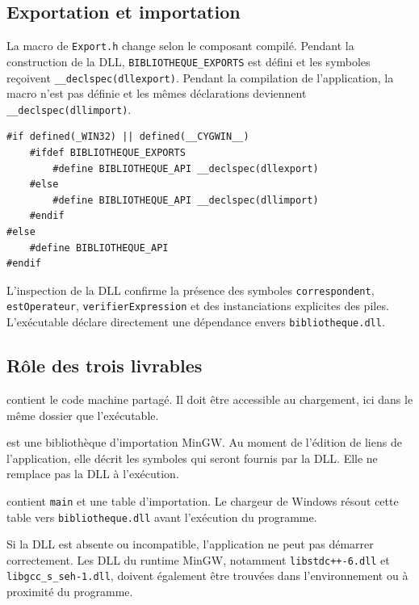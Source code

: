 \documentclass[11pt,a4paper]{article}
\newcommand{\fichier}[1]{\texttt{#1}}
\begin{document}
\subsection{Exportation et importation}

La macro de \fichier{Export.h} change selon le composant compilé. Pendant la construction de la DLL, \texttt{BIBLIOTHEQUE\_EXPORTS} est défini et les symboles reçoivent \texttt{\_\_declspec(dllexport)}. Pendant la compilation de l'application, la macro n'est pas définie et les mêmes déclarations deviennent \texttt{\_\_declspec(dllimport)}.

\begin{lstlisting}[style=cppstyle,caption={Macro de visibilité sous Windows}]
#if defined(_WIN32) || defined(__CYGWIN__)
    #ifdef BIBLIOTHEQUE_EXPORTS
        #define BIBLIOTHEQUE_API __declspec(dllexport)
    #else
        #define BIBLIOTHEQUE_API __declspec(dllimport)
    #endif
#else
    #define BIBLIOTHEQUE_API
#endif
\end{lstlisting}

L'inspection de la DLL confirme la présence des symboles \texttt{correspondent}, \texttt{estOperateur}, \texttt{verifierExpression} et des instanciations explicites des piles. L'exécutable déclare directement une dépendance envers \fichier{bibliotheque.dll}.

\subsection{Rôle des trois livrables}

\begin{description}[style=nextline,leftmargin=0pt]
  \item[\fichier{bibliotheque.dll}] contient le code machine partagé. Il doit être accessible au chargement, ici dans le même dossier que l'exécutable.
  \item[\fichier{libbibliotheque.a}] est une bibliothèque d'importation MinGW. Au moment de l'édition de liens de l'application, elle décrit les symboles qui seront fournis par la DLL. Elle ne remplace pas la DLL à l'exécution.
  \item[\fichier{application.exe}] contient \texttt{main} et une table d'importation. Le chargeur de Windows résout cette table vers \fichier{bibliotheque.dll} avant l'exécution du programme.
\end{description}

Si la DLL est absente ou incompatible, l'application ne peut pas démarrer correctement. Les DLL du runtime MinGW, notamment \fichier{libstdc++-6.dll} et \fichier{libgcc\_s\_seh-1.dll}, doivent également être trouvées dans l'environnement ou à proximité du programme.
\end{document}
